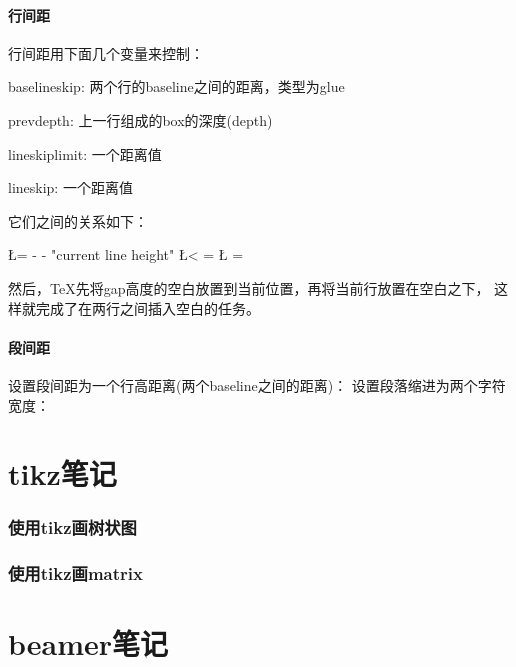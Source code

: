 ﻿\documentclass{article}
\begin{document}
  \subsection[行间距]{行间距}
  行间距用下面几个变量来控制：
  \begin{coloredenumerate}
    \item \bs baselineskip: 两个行的baseline之间的距离，类型为glue
    \item \bs prevdepth: 上一行组成的box的深度(depth)
    \item \bs lineskiplimit: 一个距离值
    \item \bs lineskip: 一个距离值
  \end{coloredenumerate}
  它们之间的关系如下：\par
  \begin{latexcode}
    \def\gap{}
    \L = \baselineskip - \prevdepth - "current line height"
    \if \L < \lineskiplimit
      \gap = \L
    \else
      \gap = \lineskip
  \end{latexcode}
  然后，\TeX{}先将\bs gap高度的空白放置到当前位置，再将当前行放置在空白之下，
  这样就完成了在两行之间插入空白的任务。
  \subsection[段间距]{段间距}
  设置段间距为一个行高距离(两个baseline之间的距离)：
  设置段落缩进为两个字符宽度：

  


  \part[tikz笔记]{tikz笔记}

  \section[使用tikz画树状图]{使用tikz画树状图}
  \section[使用tikz画matrix]{使用tikz画matrix}

  \part[beamer笔记]{beamer笔记}

\end{document}
